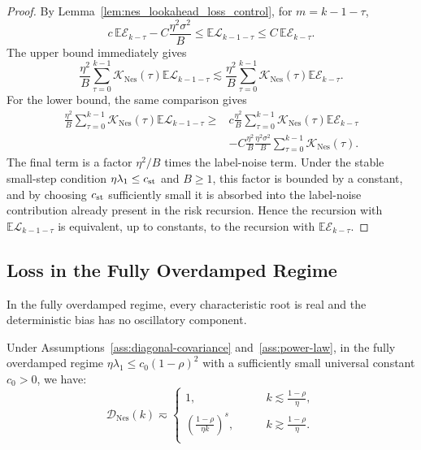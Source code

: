 \begin{proof}
By Lemma~\ref{lem:nes_lookahead_loss_control}, for \(m=k-1-\tau\),
\[
    c\,\mathbb{E}\mathcal E_{k-\tau}-C\frac{\eta^2\sigma^2}{B}
    \le
    \mathbb{E}\mathcal L_{k-1-\tau}
    \le
    C\,\mathbb{E}\mathcal E_{k-\tau}.
\]
The upper bound immediately gives
\[
    \frac{\eta^2}{B}
    \sum_{\tau=0}^{k-1}\mathcal K_{\mathrm{Nes}}(\tau)
    \mathbb{E}\mathcal L_{k-1-\tau}
    \lesssim
    \frac{\eta^2}{B}
    \sum_{\tau=0}^{k-1}\mathcal K_{\mathrm{Nes}}(\tau)
    \mathbb{E}\mathcal E_{k-\tau}.
\]
For the lower bound, the same comparison gives
\[
\begin{aligned}
    \frac{\eta^2}{B}
    \sum_{\tau=0}^{k-1}\mathcal K_{\mathrm{Nes}}(\tau)
    \mathbb{E}\mathcal L_{k-1-\tau}
    \ge{}&
    c\frac{\eta^2}{B}
    \sum_{\tau=0}^{k-1}\mathcal K_{\mathrm{Nes}}(\tau)
    \mathbb{E}\mathcal E_{k-\tau}  \\
    &-
    C\frac{\eta^2}{B}
    \frac{\eta^2\sigma^2}{B}
    \sum_{\tau=0}^{k-1}\mathcal K_{\mathrm{Nes}}(\tau).
\end{aligned}
\]
The final term is a factor \(\eta^2/B\) times the label-noise term.  Under the stable small-step condition
\(\eta\lambda_1\le c_{\rm st}\) and \(B\ge1\), this factor is bounded by a constant, and by choosing
\(c_{\rm st}\) sufficiently small it is absorbed into the label-noise contribution already present in the
risk recursion.  Hence the recursion with \(\mathbb{E}\mathcal L_{k-1-\tau}\) is equivalent, up to constants, to
the recursion with \(\mathbb{E}\mathcal E_{k-\tau}\).
\end{proof}


\subsection{Loss in the Fully Overdamped Regime}
\label{app:nes_fully_overdamped_loss}

In the fully overdamped regime, every characteristic root is real and the deterministic bias has no oscillatory component.


\begin{proposition}
\label{prop:nes_deterministic_bias0}
Under Assumptions~\ref{ass:diagonal-covariance} and~\ref{ass:power-law}, in the fully overdamped regime $\eta\lambda_1\le c_0(1-\rho)^2$ with a sufficiently small universal constant $c_0>0$, we have:
\begin{equation*}
    \mathcal{D}_{\mathrm{Nes}}(k)
    \eqsim
    \begin{cases}
    1,&\qquad k\lesssim \frac{1-\rho}{\eta},\\
    \left(\frac{1-\rho}{\eta k}\right)^s, &\qquad k\gtrsim\frac{1-\rho}{\eta}.\\
    \end{cases}
\end{equation*}
\end{proposition}

